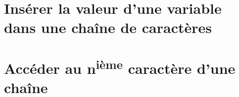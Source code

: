 \section{Insérer la valeur d'une variable dans une chaîne de caractères}

\section{Accéder au n\textsuperscript{ième} caractère d'une chaîne}
